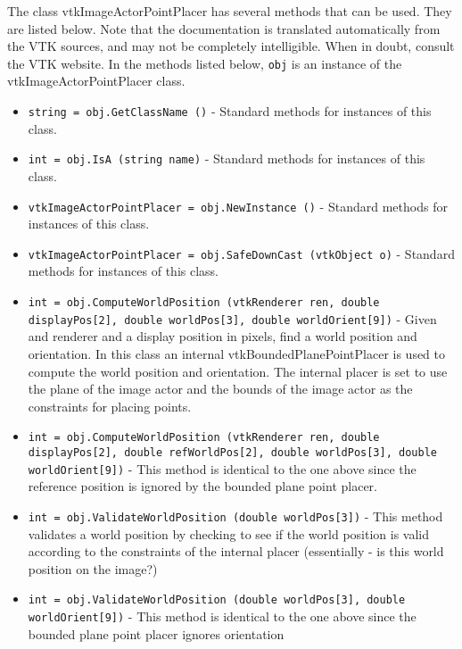 The class vtkImageActorPointPlacer has several methods that can be used.
  They are listed below.
Note that the documentation is translated automatically from the VTK sources,
and may not be completely intelligible.  When in doubt, consult the VTK website.
In the methods listed below, \verb|obj| is an instance of the vtkImageActorPointPlacer class.
\begin{itemize}
\item  \verb|string = obj.GetClassName ()| -  Standard methods for instances of this class.

\item  \verb|int = obj.IsA (string name)| -  Standard methods for instances of this class.

\item  \verb|vtkImageActorPointPlacer = obj.NewInstance ()| -  Standard methods for instances of this class.

\item  \verb|vtkImageActorPointPlacer = obj.SafeDownCast (vtkObject o)| -  Standard methods for instances of this class.

\item  \verb|int = obj.ComputeWorldPosition (vtkRenderer ren, double displayPos[2], double worldPos[3], double worldOrient[9])| -  Given and renderer and a display position in pixels,
 find a world position and orientation. In this class
 an internal vtkBoundedPlanePointPlacer is used to compute
 the world position and orientation. The internal placer
 is set to use the plane of the image actor and the bounds
 of the image actor as the constraints for placing points.

\item  \verb|int = obj.ComputeWorldPosition (vtkRenderer ren, double displayPos[2], double refWorldPos[2], double worldPos[3], double worldOrient[9])| -  This method is identical to the one above since the
 reference position is ignored by the bounded plane
 point placer.

\item  \verb|int = obj.ValidateWorldPosition (double worldPos[3])| -  This method validates a world position by checking to see
 if the world position is valid according to the constraints
 of the internal placer (essentially - is this world position
 on the image?)

\item  \verb|int = obj.ValidateWorldPosition (double worldPos[3], double worldOrient[9])| -  This method is identical to the one above since the bounded
 plane point placer ignores orientation


\end{itemize}
